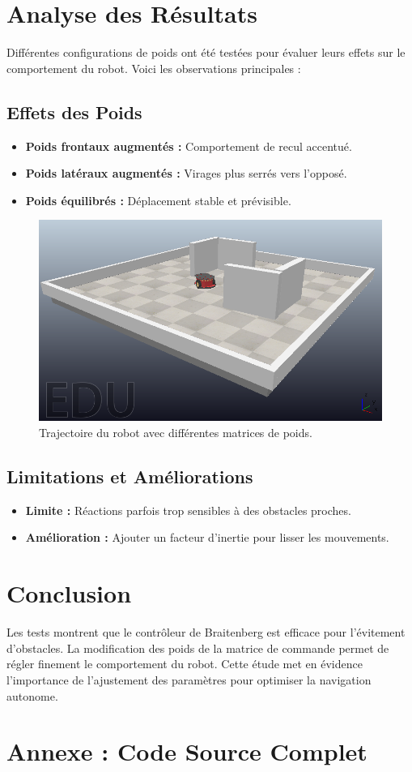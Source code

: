 \documentclass{article}
\begin{document}
\section*{Analyse des Résultats}

Différentes configurations de poids ont été testées pour évaluer leurs effets sur le comportement du robot. Voici les observations principales :

\subsection*{Effets des Poids}
\begin{itemize}
    \item \textbf{Poids frontaux augmentés :} Comportement de recul accentué.
    \item \textbf{Poids latéraux augmentés :} Virages plus serrés vers l'opposé.
    \item \textbf{Poids équilibrés :} Déplacement stable et prévisible.
\end{itemize}

\begin{figure}[h!]
    \centering
    \includegraphics[width=0.5\linewidth]{image_pionneer.PNG}
    \caption{Trajectoire du robot avec différentes matrices de poids.}
    \label{fig:trajectory}
\end{figure}

\subsection*{Limitations et Améliorations}
\begin{itemize}
    \item \textbf{Limite :} Réactions parfois trop sensibles à des obstacles proches.
    \item \textbf{Amélioration :} Ajouter un facteur d'inertie pour lisser les mouvements.
\end{itemize}

\section*{Conclusion}
Les tests montrent que le contrôleur de Braitenberg est efficace pour l'évitement d'obstacles. La modification des poids de la matrice de commande permet de régler finement le comportement du robot. Cette étude met en évidence l'importance de l'ajustement des paramètres pour optimiser la navigation autonome.

\newpage
\appendix
\section*{Annexe : Code Source Complet}


\end{document}
